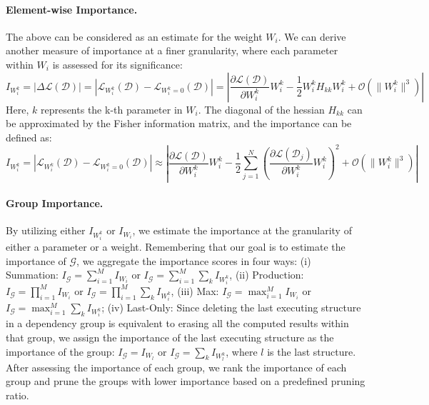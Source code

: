 \documentclass{article}
\begin{document}
\paragraph{Element-wise Importance.} The above can be considered as an estimate for the weight $W_i$. We can derive another measure of importance at a finer granularity, where each parameter within $W_i$ is assessed for its significance:
\begin{equation}
    I_{W_i^k} = | \Delta \mathcal{L}(\mathcal{D})| = |\mathcal{L}_{W_i^k}(\mathcal{D}) - \mathcal{L}_{W_i^k=0}(\mathcal{D})| = | \frac{\partial \mathcal{L}(\mathcal{D})}{\partial W_i^k} W_i^k-\frac{1}{2} {W_i^k} H_{kk} W_i^k + \mathcal{O}\left(\| W_i^k \|^3\right) |
\label{eq:element_taylor}
\end{equation} 
Here, $k$ represents the k-th parameter in $W_i$. The diagonal of the hessian $H_{kk}$ can be approximated by the Fisher information matrix, and the importance can be defined as:
\begin{equation}
    I_{W_i^k} = | \mathcal{L}_{W_i^k}(\mathcal{D}) - \mathcal{L}_{W_i^k=0}(\mathcal{D})| \approx | \frac{\partial \mathcal{L}(\mathcal{D})}{\partial W_i^k} W_i^k-\frac{1}{2} \sum_{j=1}^N \left(\frac{\partial \mathcal{L}(\mathcal{D}_j)}{\partial W_i^k} W_i^k\right)^2 + \mathcal{O}\left(\| W_i^k \|^3\right) | \label{eq:element_final_taylor}
\end{equation} 
\paragraph{Group Importance.} By utilizing either $I_{W_i^k}$ or $I_{W_i}$, we estimate the importance at the granularity of either a parameter or a weight. Remembering that our goal is to estimate the importance of $\mathcal{G}$, we aggregate the importance scores in four ways:
(i) Summation: $I_{\mathcal{G}} = \sum_{i=1}^{M}I_{W_i}$ or $I_{\mathcal{G}} = \sum_{i=1}^{M}\sum_k I_{W_i^k}$, (ii) Production: $I_{\mathcal{G}} = \prod_{i=1}^{M}I_{W_i}$ or $I_{\mathcal{G}} = \prod_{i=1}^{M}\sum_k I_{W_i^k}$, (iii) Max: $I_{\mathcal{G}} = \max_{i=1}^{M}I_{W_i}$ or $I_{\mathcal{G}} = \max_{i=1}^{M}\sum_k I_{W_i^k}$; (iv) Last-Only: Since deleting the last executing structure in a dependency group is equivalent to erasing all the computed results within that group, we assign the importance of the last executing structure as the importance of the group: $I_{\mathcal{G}} = I_{W_l}$ or $I_{\mathcal{G}} = \sum_k I_{W_l^k}$, where $l$ is the last structure. After assessing the importance of each group, we rank the importance of each group and prune the groups with lower importance based on a predefined pruning ratio.
\end{document}
